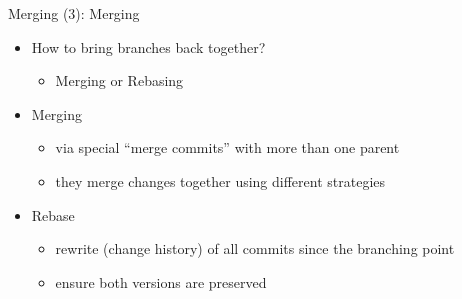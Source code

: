 \begin{frame}[fragile]{Merging (3): Merging}
  \begin{itemize}
    \item How to bring branches back together?
    \begin{itemize}
      \item Merging or Rebasing
    \end{itemize}
    \item Merging
    \begin{itemize}
      \item via special ``merge commits'' with more than one parent
      \item they merge changes together using different strategies
    \end{itemize}
    \item Rebase
    \begin{itemize}
      \item rewrite (change history) of all commits since the branching point
      \item ensure both versions are preserved
    \end{itemize}
  \end{itemize}
\end{frame}

